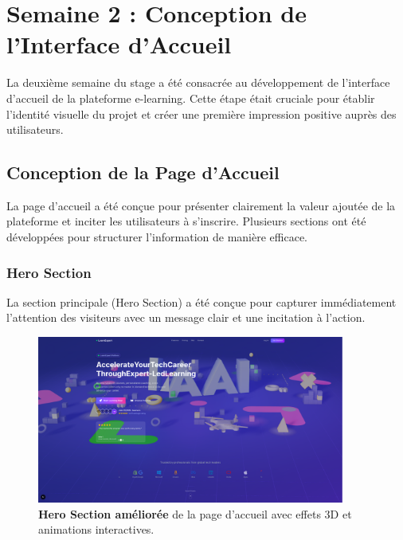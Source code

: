 \chapter{Semaine 2 : Conception de l'Interface d'Accueil}
\thispagestyle{fancy}

La deuxième semaine du stage a été consacrée au développement de l'interface d'accueil de la plateforme e-learning. Cette étape était cruciale pour établir l'identité visuelle du projet et créer une première impression positive auprès des utilisateurs.

\section{Conception de la Page d'Accueil}

La page d'accueil a été conçue pour présenter clairement la valeur ajoutée de la plateforme et inciter les utilisateurs à s'inscrire. Plusieurs sections ont été développées pour structurer l'information de manière efficace.

\subsection{Hero Section}
La section principale (Hero Section) a été conçue pour capturer immédiatement l'attention des visiteurs avec un message clair et une incitation à l'action.

\begin{figure}[h!]
  \centering
  \includegraphics[width=0.9\textwidth,keepaspectratio]{week_2_img/last_and_improved_hero_section_withe_3d_effects_etc.png}
  \caption{\textbf{Hero Section améliorée} de la page d'accueil avec effets 3D et animations interactives.}
  \label{fig:hero_section_improved}
\end{figure}

